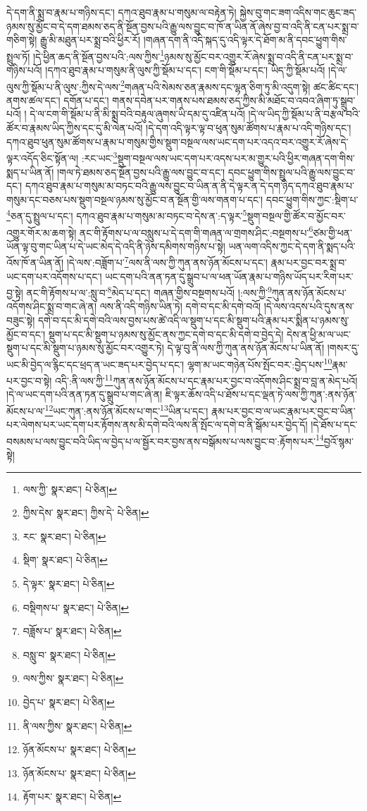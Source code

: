 དེ་དག་ནི་སྨྲ་བ་རྣམ་པ་གཉིས་དང་། དཀའ་ཐུབ་རྣམ་པ་གསུམ་ལ་བརྟེན་ཏེ། སྐྱེས་བུ་གང་ཟག་འདིས་གང་ཆུང་ཟད་ཉམས་སུ་མྱོང་བ་དེ་དག་ཐམས་ཅད་ནི་སྔོན་བྱས་པའི་རྒྱུ་ལས་བྱུང་བ་ཁོ་ན་ཡིན་ནོ་ཞེས་བྱ་བ་འདི་ནི་ངན་པར་སྨྲ་བ་གཅིག་སྟེ། རྒྱུ་མི་མཐུན་པར་སྨྲ་བའི་ཕྱིར་རོ། །གཞན་དག་ནི་འདི་སྐད་དུ་འདི་ལྟར་དེ་ཐོག་མ་ནི་དབང་ཕྱུག་གིས་སྤྲུལ་ཏོ། །དེ་ཕྱིན་ཆད་ནི་སྔོན་བྱས་པའི་:ལས་ཀྱིས་\footnote{ལས་ཀྱི་  སྣར་ཐང་།  པེ་ཅིན། }ཉམས་སུ་མྱོང་བར་འགྱུར་རོ་ཞེས་སྨྲ་བ་འདི་ནི་ངན་པར་སྨྲ་བ་གཉིས་པའོ། །དཀའ་ཐུབ་རྣམ་པ་གསུམ་ནི་ལུས་ཀྱི་སྡོམ་པ་དང་། ངག་གི་སྡོམ་པ་དང་། ཡིད་ཀྱི་སྡོམ་པའོ། །དེ་ལ་ལུས་ཀྱི་སྡོམ་པ་ནི་ལུས་:ཀྱིས་དེ་ལས་\footnote{ཀྱིས་དེས་  སྣར་ཐང་། ཀྱིས་དེ་  པེ་ཅིན། }གཞན་པའི་སེམས་ཅན་རྣམས་དང་ལྷན་ཅིག་ཏུ་མི་འདུག་སྟེ། ཚང་ཚིང་དང་། ནགས་ཚལ་དང་། དགོན་པ་དང་། གནས་དབེན་པར་གནས་པས་ཐམས་ཅད་ཀྱིས་མི་མཐོང་བ་འབའ་ཞིག་ཏུ་སྒྲུབ་པའོ། །
དེ་ལ་ངག་གི་སྡོམ་པ་ནི་མི་སྨྲ་བའི་བརྟུལ་ཞུགས་ཡི་དམ་དུ་འཛིན་པའོ། །དེ་ལ་ཡིད་ཀྱི་སྡོམ་པ་ནི་བརྩལ་བའི་ཚོར་བ་རྣམས་ཡིད་ཀྱིས་དང་དུ་མི་ལེན་པའོ། །དེ་དག་འདི་ལྟར་ལྟ་བ་ཕུན་སུམ་ཚོགས་པ་རྣམ་པ་འདི་གཉིས་དང་། དཀའ་ཐུབ་ཕུན་སུམ་ཚོགས་པ་རྣམ་པ་གསུམ་གྱིས་སྡུག་བསྔལ་ལས་ཡང་དག་པར་འདའ་བར་འགྱུར་རོ་ཞེས་དེ་ལྟར་འདོད་ཅིང་སྟོན་ལ། :རང་ཡང་\footnote{རང་  སྣར་ཐང་།  པེ་ཅིན། }སྡུག་བསྔལ་ལས་ཡང་དག་པར་འདས་པར་མ་གྱུར་པའི་ཕྱིར་གཞན་དག་གིས་སྨད་པ་ཡིན་ནོ། །གལ་ཏེ་ཐམས་ཅད་སྔོན་བྱས་པའི་རྒྱུ་ལས་བྱུང་བ་དང་། དབང་ཕྱུག་གིས་སྤྲུལ་པའི་རྒྱུ་ལས་བྱུང་བ་དང་། དཀའ་ཐུབ་རྣམ་པ་གསུམ་མ་བཏང་བའི་རྒྱུ་ལས་བྱུང་བ་ཡིན་ན་ནི་དེ་ལྟར་ན་དེ་དག་ཉིད་དཀའ་ཐུབ་རྣམ་པ་གསུམ་དང་བཅས་པས་སྡུག་བསྔལ་ཉམས་སུ་མྱོང་བ་ན་སྔོན་གྱི་ལས་གནག་པ་དང་། དབང་ཕྱུག་གིས་ཀྱང་:སྡིག་པ་\footnote{སྡིག་  སྣར་ཐང་།  པེ་ཅིན། }ཅན་དུ་སྤྲུལ་པ་དང་། དཀའ་ཐུབ་རྣམ་པ་གསུམ་མ་བཏང་བ་དེས་ན་:ད་ལྟར་\footnote{དེ་ལྟར་  སྣར་ཐང་།  པེ་ཅིན། }སྡུག་བསྔལ་གྱི་ཚོར་བ་མྱོང་བར་འགྱུར་གོར་མ་ཆག་སྟེ། ནང་གི་རྟོགས་པ་ལ་བསླུས་པ་དེ་དག་གི་གཞན་ལ་གྲགས་ཤིང་:བསྔགས་པ་\footnote{བསྡིགས་པ་  སྣར་ཐང་།  པེ་ཅིན། }ཙམ་གྱི་ཕན་ཡོན་ལྟ་བུ་གང་ཡིན་པ་དེ་ཡང་མེད་དེ་འདི་ནི་ཉེས་དམིགས་གཉིས་པ་སྟེ། ཡན་ལག་འདིས་ཀྱང་དེ་དག་ནི་སྨད་པའི་འོས་ཁོ་ན་ཡིན་ནོ། །དེ་ལས་:བཟློག་པ་\footnote{བཟློས་པ་  སྣར་ཐང་།  པེ་ཅིན། }ལས་ནི་ལས་ཀྱི་ཀུན་ནས་ཉོན་མོངས་པ་དང་། རྣམ་པར་བྱང་བར་སྨྲ་བ་ཡང་དག་པར་འདོགས་པ་དང་། ཡང་དག་པའི་ནན་ཏན་དུ་སྒྲུབ་པ་ལ་ཕན་ཡོན་རྣམ་པ་གཉིས་ཡོད་པར་རིག་པར་བྱ་སྟེ། ནང་གི་རྟོགས་པ་ལ་:སླུ་བ་\footnote{བསླུ་བ་  སྣར་ཐང་།  པེ་ཅིན། }མེད་པ་དང་། གཞན་གྱིས་བསྔགས་པའོ། །:ལས་ཀྱི་\footnote{ལས་ཀྱིས་  སྣར་ཐང་།  པེ་ཅིན། }ཀུན་ནས་ཉོན་མོངས་པ་འདོགས་ཤིང་སྨྲ་བ་གང་ཞེ་ན། ལས་ནི་འདི་གཉིས་ཡིན་ཏེ། དགེ་བ་དང་མི་དགེ་བའོ། །དེ་ལས་འདས་པའི་དུས་ནས་བཟུང་སྟེ། དགེ་བ་དང་མི་དགེ་བའི་ལས་བྱས་པས་ཚེ་འདི་ལ་སྡུག་པ་དང་མི་སྡུག་པའི་རྣམ་པར་སྨིན་པ་ཉམས་སུ་མྱོང་བ་དང་། སྡུག་པ་དང་མི་སྡུག་པ་ཉམས་སུ་མྱོང་ནས་ཀྱང་དགེ་བ་དང་མི་དགེ་བ་བྱེད་དེ། དེས་ན་ཕྱི་མ་ལ་ཡང་སྡུག་པ་དང་མི་སྡུག་པ་ཉམས་སུ་མྱོང་བར་འགྱུར་ཏེ། དེ་ལྟ་བུ་ནི་ལས་ཀྱི་ཀུན་ནས་ཉོན་མོངས་པ་ཡིན་ནོ། །གསར་དུ་ཡང་མི་བྱེད་ལ་རྙིང་དང་ཕྲད་ན་ཡང་ཟད་པར་བྱེད་པ་དང་། ལྷག་མ་ཡང་གཉེན་པོས་སྤོང་བར་:བྱེད་པས་\footnote{བྱེད་པ་  སྣར་ཐང་།  པེ་ཅིན། }རྣམ་པར་བྱང་བ་སྟེ། འདི་:ནི་ལས་ཀྱི་\footnote{ནི་ལས་ཀྱིས་  སྣར་ཐང་།  པེ་ཅིན། }ཀུན་ནས་ཉོན་མོངས་པ་དང་རྣམ་པར་བྱང་བ་འདོགས་ཤིང་སྨྲ་བ་བླ་ན་མེད་པའོ། །དེ་ལ་ཡང་དག་པའི་ནན་ཏན་དུ་སྒྲུབ་པ་གང་ཞེ་ན། ཇི་ལྟར་ཆོས་འདི་པ་ཐོས་པ་དང་ལྡན་ཏེ་ལས་ཀྱི་ཀུན་:ནས་ཉོན་མོངས་པ་ལ་\footnote{ཉོན་མོངས་པ་  སྣར་ཐང་།  པེ་ཅིན། }ཡང་ཀུན་:ནས་ཉོན་མོངས་པ་གང་\footnote{ཉོན་མོངས་པ་  སྣར་ཐང་།  པེ་ཅིན། }ཡིན་པ་དང་། རྣམ་པར་བྱང་བ་ལ་ཡང་རྣམ་པར་བྱང་བ་ཡིན་པར་ལེགས་པར་ཡང་དག་པར་རྟོགས་ནས་མི་དགེ་བའི་ལས་ནི་སྤོང་ལ་དགེ་བ་ནི་སྒོམ་པར་བྱེད་དོ། །དེ་ཐོས་པ་དང་བསམས་པ་ལས་བྱུང་བའི་ཡིད་ལ་བྱེད་པ་ལ་སྦྱོར་བར་བྱས་ནས་བསྒོམས་པ་ལས་བྱུང་བ་:རྟོགས་པར་\footnote{རྟོག་པར་  སྣར་ཐང་།  པེ་ཅིན། }བྱའོ་སྙམ་སྟེ། 